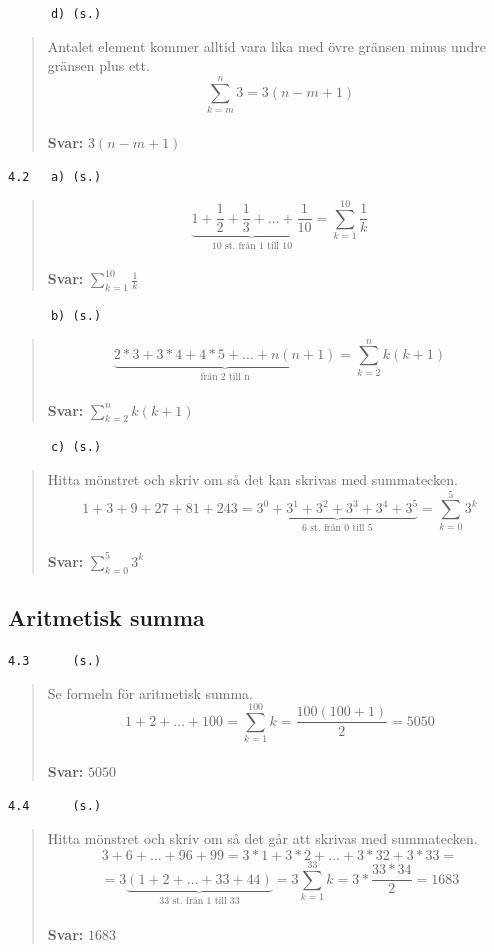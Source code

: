 \documentclass[a4paper]{article}
\newcommand{\tskcol}[1]{\textcolor{tskcol}{#1}}
\begin{document}
	\texttt{\tskcol{~~~~~~d) (s.)}}
	\begin{quotation}
		\noindent
		Antalet element kommer alltid vara lika med övre gränsen minus undre gränsen plus ett.
		\[\sum_{k=m}^{n}3=3(n-m+1)\]
		\\
		\textbf{Svar:} $3(n-m+1)$
	\end{quotation}
	
	\texttt{\tskcol{4.2~~~a) (s.)}}
	\begin{quotation}
		\noindent
		\[\underbrace{1+\frac{1}{2}+\frac{1}{3}+\ldots+\frac{1}{10}}_\text{10 st. från 1 till 10}=
		\sum_{k=1}^{10}\frac{1}{k}\]
		\\
		\textbf{Svar:} $\displaystyle\sum_{k=1}^{10}\frac{1}{k}$
	\end{quotation}
	
	\texttt{\tskcol{~~~~~~b) (s.)}}
	\begin{quotation}
		\noindent
		\[\underbrace{2*3+3*4+4*5+\ldots+n(n+1)}_\text{från 2 till n}=
		\sum_{k=2}^{n}k(k+1)\]
		\\
		\textbf{Svar:} $\displaystyle\sum_{k=2}^{n}k(k+1)$
	\end{quotation}
	
	\texttt{\tskcol{~~~~~~c) (s.)}}
	\begin{quotation}
		\noindent
		Hitta mönstret och skriv om så det kan skrivas med summatecken.
		\[1+3+9+27+81+243=
		\underbrace{3^0+3^1+3^2+3^3+3^4+3^5}_\text{6 st. från 0 till 5}=
		\sum_{k=0}^{5}3^k\]
		\\
		\textbf{Svar:} $\displaystyle\sum_{k=0}^{5}3^k$
	\end{quotation}
	
	\subsection*{Aritmetisk summa}
	
	\texttt{\tskcol{4.3~~~~~ (s.)}}
	\begin{quotation}
		\noindent
		Se formeln för aritmetisk summa.
		\[1+2+\ldots+100=\sum_{k=1}^{100}k=\frac{100(100+1)}{2}=5050\]
		\\
		\textbf{Svar:} $5050$
	\end{quotation}
	
	\texttt{\tskcol{4.4~~~~~ (s.)}}
	\begin{quotation}
		\noindent
		Hitta mönstret och skriv om så det går att skrivas med summatecken.
		\[3+6+\ldots+96+99=
		3*1+3*2+\ldots+3*32+3*33=\]
		\[=3\underbrace{(1+2+\ldots+33+44)}_\text{33 st. från 1 till 33}=
		3\sum_{k=1}^{33}k=
		3*\frac{33*34}{2}=
		1683\]
		\\
		\textbf{Svar:} $1683$
	\end{quotation}
	
\end{document}
